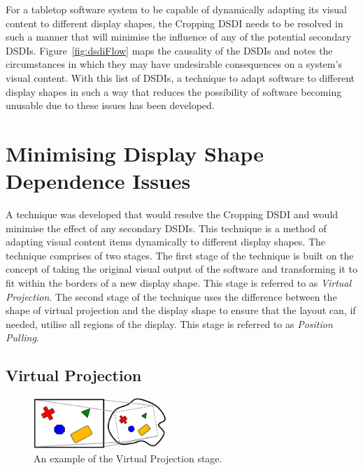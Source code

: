 \documentclass[review,5p,times,twocolumn]{elsarticle}
\begin{document}
For a tabletop software system to be capable of dynamically adapting its visual content to different display shapes, the Cropping \ac{DSDI} needs to be resolved in such a manner that will minimise the influence of any of the potential secondary \acp{DSDI}.
Figure~\ref{fig:dsdiFlow} maps the causality of the \acp{DSDI} and notes the circumstances in which they may have undesirable consequences on a system's visual content.
With this list of \acp{DSDI}, a technique to adapt software to different display shapes in such a way that reduces the possibility of software becoming unusable due to these issues has been developed.

\section{Minimising Display Shape Dependence Issues}
\label{sec:solution}

A technique was developed that would resolve the Cropping \ac{DSDI} and would minimise the effect of any secondary \acp{DSDI}.
This technique is a method of adapting visual content items dynamically to different display shapes.
The technique comprises of two stages.
The first stage of the technique is built on the concept of taking the original visual output of the software and transforming it to fit within the borders of a new display shape.
This stage is referred to as {\em Virtual Projection}.
The second stage of the technique uses the difference between the shape of virtual projection and the display shape to ensure that the layout can, if needed, utilise all regions of the display.
This stage is referred to as {\em Position Pulling}.


\subsection{Virtual Projection}
\label{subsec:virtualprojection}

\begin{figure}[h]
 \centering
   \includegraphics[width=0.45\textwidth]{figures/virtual_rectangle.png}
   \caption{An example of the Virtual Projection stage.}
   \label{fig:virtualRectangle}
\end{figure}
\end{document}
